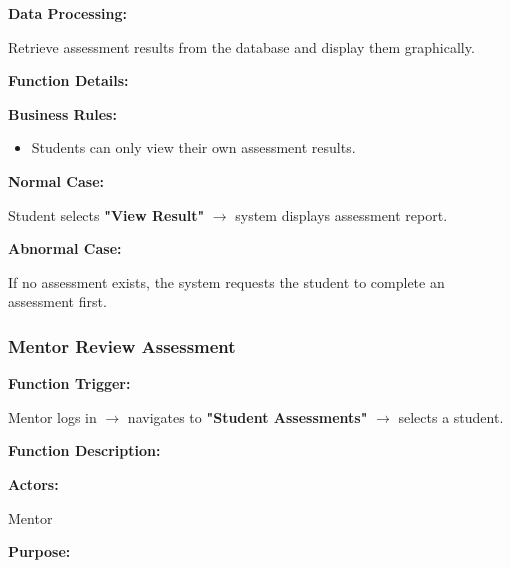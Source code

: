 \vspace{0.2cm}

\textbf{Data Processing:}

Retrieve assessment results from the database and display them graphically.

\vspace{0.3cm}

\textbf{Function Details:}

\textbf{Business Rules:}

\begin{itemize}
\item Students can only view their own assessment results.
\end{itemize}

\textbf{Normal Case:}

Student selects \textbf{"View Result"} $\rightarrow$ system displays assessment report.

\textbf{Abnormal Case:}

If no assessment exists, the system requests the student to complete an assessment first.

%

\subsubsection{Mentor Review Assessment}

\textbf{Function Trigger:}

Mentor logs in $\rightarrow$ navigates to \textbf{"Student Assessments"} $\rightarrow$ selects a student.

\vspace{0.3cm}

\textbf{Function Description:}

\textbf{Actors:}

Mentor

\vspace{0.2cm}

\textbf{Purpose:}

